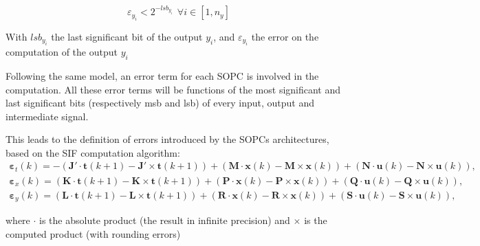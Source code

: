 	\begin{equation} \label{condition}
		\varepsilon_{y_i} < 2^{-lsb_{y_i}} \hspace{5pt} \forall i \in [1,n_y]
	\end{equation}

	With $lsb_{y_i}$ the last significant bit of the output $y_i$, and $\varepsilon_{y_i}$ the error on the computation of the output $y_i$

	Following the same model, an error term for each SOPC is involved in the computation.
	All these error terms will be functions of the most significant and last significant bits (respectively msb and lsb) of every input, output and intermediate signal.

	This leads to the definition of errors introduced by the SOPCs architectures, based on the SIF computation algorithm:
		\begin{eqnarray}
				\boldsymbol{\varepsilon}_t(k) =
				- ( \boldsymbol{J'} \cdot \boldsymbol{t}(k+1) - \boldsymbol{J'} \times \boldsymbol{t}(k+1) ) 
				+ ( \boldsymbol{M } \cdot \boldsymbol{x}(k  ) - \boldsymbol{M } \times \boldsymbol{x}(k  ) )
				+ ( \boldsymbol{N } \cdot \boldsymbol{u}(k  ) - \boldsymbol{N } \times \boldsymbol{u}(k  ) ),\\ 
				\boldsymbol{\varepsilon}_x(k) =
				  ( \boldsymbol{K } \cdot \boldsymbol{t}(k+1) - \boldsymbol{K } \times \boldsymbol{t}(k+1) ) 
				+ ( \boldsymbol{P } \cdot \boldsymbol{x}(k  ) - \boldsymbol{P } \times \boldsymbol{x}(k  ) )
				+ ( \boldsymbol{Q } \cdot \boldsymbol{u}(k  ) - \boldsymbol{Q } \times \boldsymbol{u}(k  ) ),\\ 
				\boldsymbol{\varepsilon}_y(k) =
				  ( \boldsymbol{L } \cdot \boldsymbol{t}(k+1) - \boldsymbol{L } \times \boldsymbol{t}(k+1) ) 
				+ ( \boldsymbol{R } \cdot \boldsymbol{x}(k  ) - \boldsymbol{R } \times \boldsymbol{x}(k  ) )
				+ ( \boldsymbol{S } \cdot \boldsymbol{u}(k  ) - \boldsymbol{S } \times \boldsymbol{u}(k  ) ),
		\end{eqnarray}

		where $\cdot$ is the absolute product (the result in infinite precision) and $\times$ is the computed product (with rounding errors)


